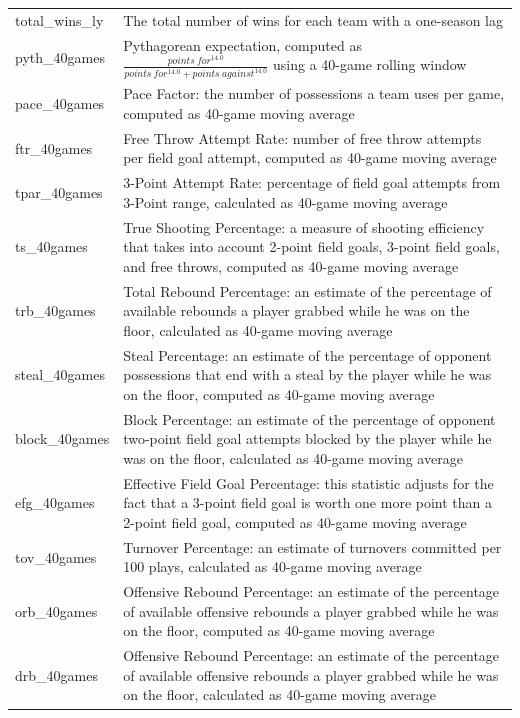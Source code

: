 \documentclass[
    12pt,
    a4paper,
    titlepage,  %
    abstract,  %
    headings=standardclasses,  %
    bibliography=totocnumbered  %
]{scrartcl}
\begin{document}
\begin{longtable}{|>{\ttfamily}l|L{4.17in}|}
     \\ \hline
    total\_wins\_ly & The total number of wins for each team with a one-season lag \\ \hline
    pyth\_40games & Pythagorean expectation, computed as $\frac{points\ for^{14.0}}{points\ for^{14.0} + points\ against^{14.0}}$ using a 40-game rolling window \\ \hline
    pace\_40games & Pace Factor: the number of possessions a team uses per game, computed as 40-game moving average \\ \hline
    ftr\_40games & Free Throw Attempt Rate: number of free throw attempts per field goal attempt, computed as 40-game moving average \\ \hline
    tpar\_40games & 3-Point Attempt Rate: percentage of field goal attempts from 3-Point range, calculated as 40-game moving average \\ \hline
    ts\_40games & True Shooting Percentage: a measure of shooting efficiency that takes into account 2-point field goals, 3-point field goals, and free throws, computed as 40-game moving average \\ \hline
    trb\_40games & Total Rebound Percentage: an estimate of the percentage of available rebounds a player grabbed while he was on the floor, calculated as 40-game moving average \\ \hline
    steal\_40games & Steal Percentage: an estimate of the percentage of opponent possessions that end with a steal by the player while he was on the floor, computed as 40-game moving average \\ \hline
    block\_40games & Block Percentage: an estimate of the percentage of opponent two-point field goal attempts blocked by the player while he was on the floor, calculated as 40-game moving average \\ \hline
    efg\_40games & Effective Field Goal Percentage: this statistic adjusts for the fact that a 3-point field goal is worth one more point than a 2-point field goal, computed as 40-game moving average \\ \hline
    tov\_40games & Turnover Percentage: an estimate of turnovers committed per 100 plays, calculated as 40-game moving average \\ \hline
    orb\_40games & Offensive Rebound Percentage: an estimate of the percentage of available offensive rebounds a player grabbed while he was on the floor, computed as 40-game moving average \\ \hline
    drb\_40games & Offensive Rebound Percentage: an estimate of the percentage of available offensive rebounds a player grabbed while he was on the floor, calculated as 40-game moving average \\ \hline
    

\end{longtable}
\end{document}
